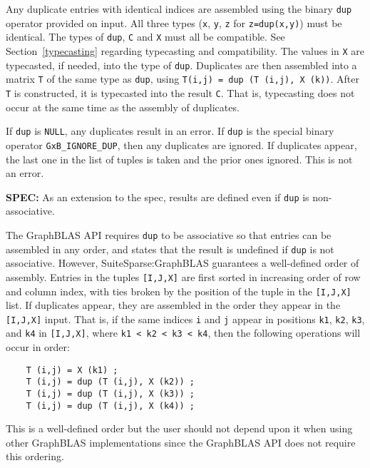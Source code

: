 \documentclass[12pt]{article}
\begin{document}
Any duplicate entries with identical indices are assembled using the binary
\verb'dup' operator provided on input.  All three types (\verb'x', \verb'y',
\verb'z' for \verb'z=dup(x,y)') must be identical.  The types of \verb'dup',
\verb'C' and \verb'X' must all be compatible.  See Section~\ref{typecasting}
regarding typecasting and compatibility.  The values in \verb'X' are
typecasted, if needed, into the type of \verb'dup'.  Duplicates are then
assembled into a matrix \verb'T' of the same type as \verb'dup', using
\verb'T(i,j) = dup (T (i,j), X (k))'.  After \verb'T' is constructed, it is
typecasted into the result \verb'C'.  That is, typecasting does not occur at
the same time as the assembly of duplicates.

If \verb'dup' is \verb'NULL', any duplicates result in an error.
If \verb'dup' is the special binary operator \verb'GxB_IGNORE_DUP', then
any duplicates are ignored.  If duplicates appear, the last one in the
list of tuples is taken and the prior ones ignored.  This is not an error.

\begin{alert}
{\bf SPEC:} As an extension to the spec, results are defined even if \verb'dup'
is non-associative.
\end{alert}

The GraphBLAS API requires \verb'dup' to be associative so
that entries can be assembled in any order, and states that the result is
undefined if \verb'dup' is not associative.  However, SuiteSparse:GraphBLAS
guarantees a well-defined order of assembly.  Entries in the tuples
\verb'[I,J,X]' are first sorted in increasing order of row and column index,
with ties broken by the position of the tuple in the \verb'[I,J,X]' list.  If
duplicates appear, they are assembled in the order they appear in the
\verb'[I,J,X]' input.  That is, if the same indices \verb'i' and \verb'j'
appear in positions \verb'k1', \verb'k2', \verb'k3', and \verb'k4' in
\verb'[I,J,X]', where \verb'k1 < k2 < k3 < k4', then the following operations
will occur in order:

    {\footnotesize
    \begin{verbatim}
    T (i,j) = X (k1) ;
    T (i,j) = dup (T (i,j), X (k2)) ;
    T (i,j) = dup (T (i,j), X (k3)) ;
    T (i,j) = dup (T (i,j), X (k4)) ; \end{verbatim}}

This is a well-defined order but the user should not depend upon it when using
other GraphBLAS implementations since the GraphBLAS API does not
require this ordering.
\end{document}
